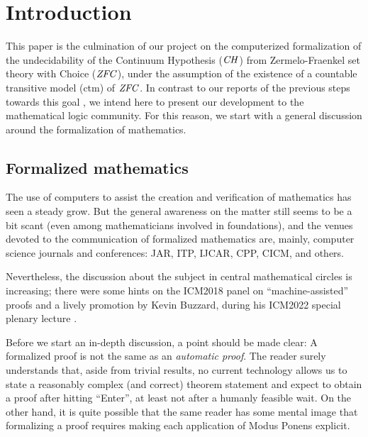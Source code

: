\section{Introduction}
\label{sec:introduction}

This paper is the culmination of our project on the computerized
formalization of the undecidability of the Continuum Hypothesis
($\mathit{CH}$) from Zermelo-Fraenkel set theory with Choice ($\mathit{ZFC}$), under the
assumption of the existence of a countable transitive model (ctm) of
$\mathit{ZFC}$. In contrast to our reports of the previous steps towards this
goal
\cite{2018arXiv180705174G,2019arXiv190103313G,2020arXiv200109715G}, we
intend here to present our development to the mathematical logic
community. For this reason, we start with a general discussion around
the formalization of mathematics.

\subsection{Formalized mathematics}
The use of computers to assist the creation and verification of
mathematics has seen a steady grow. But the general awareness on the
matter still seems to be a bit scant (even among mathematicians
involved in foundations), and the venues devoted to the communication
of formalized mathematics are, mainly, computer science journals and
conferences: JAR, ITP, IJCAR, CPP, CICM, and others.

Nevertheless, the discussion about the subject in central mathematical
circles is increasing; there were some hints on the ICM2018 panel on
“machine-assisted” proofs
\cite{https://doi.org/10.48550/arxiv.1809.08062} and a lively
promotion by Kevin Buzzard, during his ICM2022 special plenary lecture
\cite{2021arXiv211211598B}.


Before we start an in-depth discussion, a point should be made clear:
A formalized proof is not the same as an \emph{automatic proof}. The
reader surely understands that, aside from trivial results, no current
technology allows us to state a reasonably complex (and correct) theorem
statement and expect to obtain a proof after hitting ``Enter'', at
least not after a humanly feasible wait. On the other hand, it is
quite possible that the same reader has some mental image that
formalizing a proof requires making each application of Modus Ponens
explicit.

